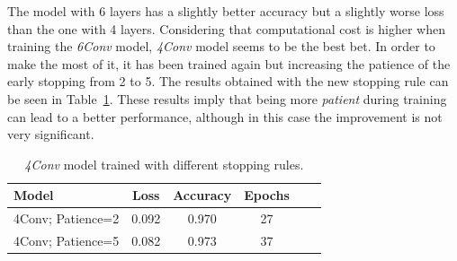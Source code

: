 The model with 6 layers has a slightly better accuracy but a slightly worse loss than the one with 4 layers. Considering that computational cost is higher when training the \textit{6Conv} model, \textit{4Conv} model seems to be the best bet. In order to make the most of it, it has been trained again but increasing the patience of the early stopping from 2 to 5. The results obtained with the new stopping rule can be seen in Table~\ref{tbl:arch_patience5}. These results imply that being more \textit{patient} during training can lead to a better performance, although in this case the improvement is not very significant.
\begin{table}
	\centering
	\begin{tabular}{l*{4}{c}r}
		\textbf{Model} & \textbf{Loss} & \textbf{Accuracy} & \textbf{Epochs} \\
		\hline
		4Conv; Patience=2 & 0.092 & 0.970 & 27 \\
		4Conv; Patience=5 & 0.082 & 0.973 & 37 \\
	\end{tabular}
	\caption{\textit{4Conv} model trained with different stopping rules.}
	\label{tbl:arch_patience5}
\end{table}
